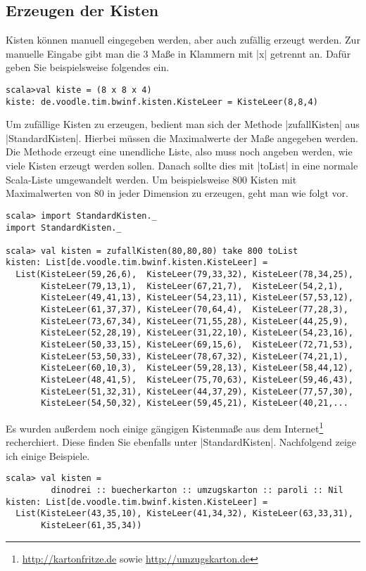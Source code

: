 \subsection{Erzeugen der Kisten}
Kisten können manuell eingegeben werden, aber auch zufällig erzeugt werden.
Zur manuelle Eingabe gibt man die 3 Maße in Klammern mit |x| getrennt an.
Dafür geben Sie beispielsweise folgendes ein.
\begin{lstlisting}
scala>val kiste = (8 x 8 x 4)
kiste: de.voodle.tim.bwinf.kisten.KisteLeer = KisteLeer(8,8,4)

\end{lstlisting}
Um zufällige Kisten zu erzeugen, bedient man sich der Methode |zufallKisten| aus |StandardKisten|.
Hierbei müssen die Maximalwerte der Maße angegeben werden.
Die Methode erzeugt eine unendliche Liste, also muss noch angeben werden, wie viele Kisten erzeugt werden sollen.
Danach sollte dies mit |toList| in eine normale Scala-Liste umgewandelt werden.
Um beispielsweise 800 Kisten mit Maximalwerten von 80 in jeder Dimension zu erzeugen, geht man wie folgt vor.
\begin{lstlisting}
scala> import StandardKisten._
import StandardKisten._

scala> val kisten = zufallKisten(80,80,80) take 800 toList
kisten: List[de.voodle.tim.bwinf.kisten.KisteLeer] =
  List(KisteLeer(59,26,6),  KisteLeer(79,33,32), KisteLeer(78,34,25),
       KisteLeer(79,13,1),  KisteLeer(67,21,7),  KisteLeer(54,2,1),
       KisteLeer(49,41,13), KisteLeer(54,23,11), KisteLeer(57,53,12),
       KisteLeer(61,37,37), KisteLeer(70,64,4),  KisteLeer(77,28,3),
       KisteLeer(73,67,34), KisteLeer(71,55,28), KisteLeer(44,25,9),
       KisteLeer(52,28,19), KisteLeer(31,22,10), KisteLeer(54,23,16),
       KisteLeer(50,33,15), KisteLeer(69,15,6),  KisteLeer(72,71,53),
       KisteLeer(53,50,33), KisteLeer(78,67,32), KisteLeer(74,21,1),
       KisteLeer(60,10,3),  KisteLeer(59,28,13), KisteLeer(58,44,12),
       KisteLeer(48,41,5),  KisteLeer(75,70,63), KisteLeer(59,46,43),
       KisteLeer(51,32,31), KisteLeer(44,37,29), KisteLeer(77,57,30),
       KisteLeer(54,50,32), KisteLeer(59,45,21), KisteLeer(40,21,...
\end{lstlisting}
Es wurden außerdem noch einige gängigen Kistenmaße aus dem Internet\footnote{\href{http://kartonfritze.de}{http://kartonfritze.de}
                                                                        sowie \href{http://umzugskarton.de}{http://umzugskarton.de}} recherchiert.
Diese finden Sie ebenfalls unter |StandardKisten|.
Nachfolgend zeige ich einige Beispiele.
\begin{lstlisting}
scala> val kisten =
         dinodrei :: buecherkarton :: umzugskarton :: paroli :: Nil
kisten: List[de.voodle.tim.bwinf.kisten.KisteLeer] =
  List(KisteLeer(43,35,10), KisteLeer(41,34,32), KisteLeer(63,33,31),
       KisteLeer(61,35,34))

\end{lstlisting}
